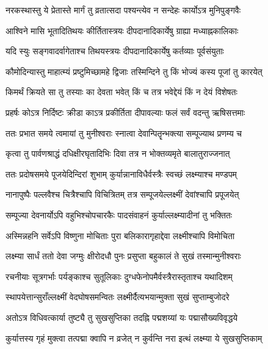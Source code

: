 \twolineshloka
{नरकस्थास्तु ये प्रेतास्ते मार्गं तु व्रतात्सदा}
{पश्यन्त्येव न सन्देहः कार्योऽत्र मुनिपुङ्गवैः} %

\twolineshloka
{आश्विने मासि भूतादितिथयः कीर्तितास्त्रयः}
{दीपदानादिकार्येषु ग्राह्या मध्याह्नकालिकाः} %

\twolineshloka
{यदि स्युः सङ्गवादर्वागेताश्च तिथयस्त्रयः}
{दीपदानादिकार्येषु कर्तव्याः पूर्वसंयुताः} %


\twolineshloka
{कौमोदिन्यास्तु माहात्म्यं प्रष्टुमिच्छामहे द्विजाः}
{तस्मिन्दिने तु किं भोज्यं कस्य पूजां तु कारयेत्} %

\twolineshloka
{किमर्थं क्रियते सा तु तस्याः का देवता भवेत्}
{किं च तत्र भवेद्देयं किं न देयं विशेषतः} %

\twolineshloka
{प्रहर्षः कोऽत्र निर्दिष्टः क्रीडा काऽत्र प्रकीर्तिता}
{दीपावल्याः फलं सर्वं वदन्तु ऋषिसत्तमाः} %


\twolineshloka
{ततः प्रभात समये त्वमायां तु मुनीश्वराः}
{स्नात्वा देवान्पितॄन्भक्त्या सम्पूज्याथ प्रणम्य च} %

\twolineshloka
{कृत्वा तु पार्वणश्राद्धं दधिक्षीरघृतादिभिः}
{दिवा तत्र न भोक्तव्यमृते बालातुराज्जनात्} %

\twolineshloka
{ततः प्रदोषसमये पूजयेदिन्दिरां शुभाम्}
{कुर्यान्नानाविधैर्वस्त्रैः स्वच्छं लक्ष्म्याश्च मण्डपम्} %

\twolineshloka
{नानापुष्पैः पल्लवैश्च चित्रैश्चापि विचित्रितम्}
{तत्र सम्पूजयेल्लक्ष्मीं देवांश्चापि प्रपूजयेत्} %

\twolineshloka
{सम्पूज्या देवनार्योऽपि वहुभिश्चोपचारकैः}
{पादसंवाहनं कुर्याल्लक्ष्म्यादीनां तु भक्तितः} %

\twolineshloka
{अस्मिन्नहनि सर्वेऽपि विष्णुना मोचिताः पुरा}
{बलिकारागृहाद्देवा लक्ष्मीश्चापि विमोचिता} %

\twolineshloka
{लक्ष्म्या सार्धं ततो देवा जग्मुः क्षीरोदधौ पुनः}
{प्रसुप्ता बहुकालं ते सुखं तस्मान्मुनीश्वराः} %

\twolineshloka
{रचनीयाः सूत्रगर्भाः पर्यङ्काश्च सुतूलिकाः}
{दुग्धफेनोपमैर्वस्त्रैरास्तृताश्च यथादिशम्} %

\twolineshloka
{स्थापयेत्तान्सुराँल्लक्ष्मीं वेदघोषसमन्वितः}
{लक्ष्मीर्दैत्यभयान्मुक्ता सुखं सुप्ताम्बुजोदरे} %

\twolineshloka
{अतोऽत्र विधिवत्कार्या तुष्ट्यै तु सुखसुप्तिका}
{तदह्नि पद्मशय्यां यः पद्मासौख्यविवृद्धये} %

\twolineshloka
{कुर्यात्तस्य गृहं मुक्त्वा तत्पद्मा क्वापि न व्रजेत्}
{न कुर्वन्ति नरा इत्थं लक्ष्म्या ये सुखसुप्तिकाम्} %

